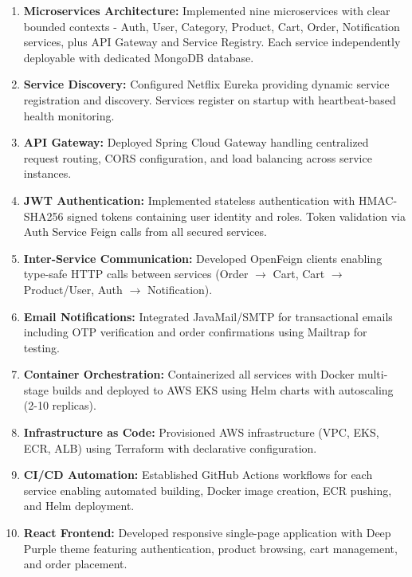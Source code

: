\begin{enumerate}
    \item \textbf{Microservices Architecture:} Implemented nine microservices with clear bounded contexts - Auth, User, Category, Product, Cart, Order, Notification services, plus API Gateway and Service Registry. Each service independently deployable with dedicated MongoDB database.
    
    \item \textbf{Service Discovery:} Configured Netflix Eureka providing dynamic service registration and discovery. Services register on startup with heartbeat-based health monitoring.
    
    \item \textbf{API Gateway:} Deployed Spring Cloud Gateway handling centralized request routing, CORS configuration, and load balancing across service instances.
    
    \item \textbf{JWT Authentication:} Implemented stateless authentication with HMAC-SHA256 signed tokens containing user identity and roles. Token validation via Auth Service Feign calls from all secured services.
    
    \item \textbf{Inter-Service Communication:} Developed OpenFeign clients enabling type-safe HTTP calls between services (Order $\rightarrow$ Cart, Cart $\rightarrow$ Product/User, Auth $\rightarrow$ Notification).
    
    \item \textbf{Email Notifications:} Integrated JavaMail/SMTP for transactional emails including OTP verification and order confirmations using Mailtrap for testing.
    
    \item \textbf{Container Orchestration:} Containerized all services with Docker multi-stage builds and deployed to AWS EKS using Helm charts with autoscaling (2-10 replicas).
    
    \item \textbf{Infrastructure as Code:} Provisioned AWS infrastructure (VPC, EKS, ECR, ALB) using Terraform with declarative configuration.
    
    \item \textbf{CI/CD Automation:} Established GitHub Actions workflows for each service enabling automated building, Docker image creation, ECR pushing, and Helm deployment.
    
    \item \textbf{React Frontend:} Developed responsive single-page application with Deep Purple theme featuring authentication, product browsing, cart management, and order placement.
\end{enumerate}

